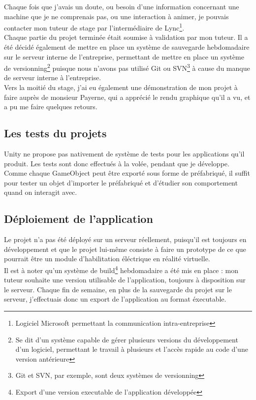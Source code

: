 \documentclass[a4paper]{article}
\begin{document}
    Chaque fois que j'avais un doute, ou besoin d'une information concernant une machine que je ne comprenais pas, ou une interaction à animer, je pouvais contacter mon tuteur de stage par l'intermédiaire de Lync\footnote{Logiciel Microsoft permettant la communication intra-entreprise}. \\

    Chaque partie du projet terminée était soumise à validation par mon tuteur. Il a été décidé également de mettre en place un système de sauvegarde hebdomadaire sur le serveur interne de l'entreprise, permettant de mettre en place un système de versionning\footnote{Se dit d'un système capable de gérer plusieurs versions du développement d'un logiciel, permettant le travail à plusieurs et l'accès rapide au code d'une version antérieure} puisque nous n'avons pas utilisé Git ou SVN\footnote{Git et SVN, par exemple, sont deux systèmes de versionning} à cause du manque de serveur interne à l'entreprise. \\

    Vers la moitié du stage, j'ai eu également une démonstration de mon projet à faire auprès de monsieur Payerne, qui a apprécié le rendu graphique qu'il a vu, et a pu me faire quelques retours. \\

    \subsection{Les tests du projets}

    Unity ne propose pas nativement de système de tests pour les applications qu'il produit. Les tests sont donc effectués à la volée, pendant que je développe. Comme chaque GameObject peut être exporté sous forme de préfabriqué, il suffit pour tester un objet d'importer le préfabriqué et d'étudier son comportement quand on interagit avec.

    \subsection{Déploiement de l'application}
   
    Le projet n'a pas été déployé sur un serveur réellement, puisqu'il est toujours en développement et que le projet lui-même consiste à faire un prototype de ce que pourrait être un module d'habilitation éléctrique en réalité virtuelle. \\

    Il est à noter qu'un système de build\footnote{Export d'une version executable de l'application développée} hebdomadaire a été mis en place : mon tuteur souhaite une version utilisable de l'application, toujours à disposition sur le serveur. Chaque fin de semaine, en plus de la sauvegarde du projet sur le serveur, j'effectuais donc un export de l'application au format éxecutable. \\
    
\end{document}
